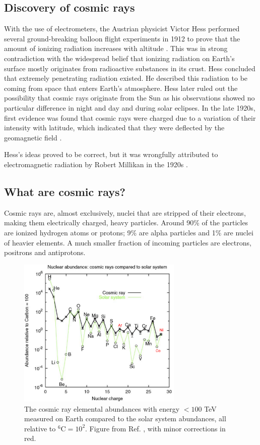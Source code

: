 \subsection{Discovery of cosmic rays}
With the use of electrometers, the Austrian physicist Victor Hess performed several ground-breaking balloon flight experiments in 1912 to prove that the amount of ionizing radiation increases with altitude \cite{hessnobel:1936}. This was in strong contradiction with the widespread belief that ionizing radiation on Earth's surface mostly originates from radioactive substances in its crust. Hess concluded that extremely penetrating radiation existed. He described this radiation to be coming from space that enters Earth's atmosphere.
Hess later ruled out the possibility that cosmic rays originate from the Sun as his observations showed no particular difference in night and day and during solar eclipses. In the late 1920s, first evidence was found that cosmic rays were charged due to a variation of their intensity with latitude, which indicated that they were deflected by the geomagnetic field \cite{clay:1927a}.

Hess's ideas proved to be correct, but it was wrongfully attributed to electromagnetic radiation by Robert Millikan in the 1920s \cite{PhysRev.32.533}. 

\subsection{What are cosmic rays?}
\label{subsec:whatarecosmicrays}
Cosmic rays are, almost exclusively, nuclei that are stripped of their electrons, making them electrically charged, heavy particles. Around 90\% of the particles are ionized hydrogen atoms or protons; 9\% are alpha particles and 1\% are nuclei of heavier elements. A much smaller fraction of incoming particles are electrons, positrons and antiprotons.

\begin{figure}
\centering
\includegraphics[width=0.7\textwidth]{./chapter3/img/relativeabundanceGaisser.png}
\caption{The cosmic ray elemental abundances with energy $<100$ TeV  measured on Earth compared to the solar system abundances, all relative to ${}^{6}\textrm{C} = 10^2$. Figure from Ref. \cite{GAISSER200698}, with minor corrections in red.}
\label{fig:relabundance}
\end{figure}


